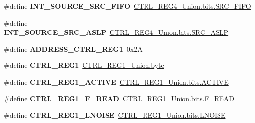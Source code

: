 \begin{DoxyCompactItemize}
\item 
\hypertarget{group__accel__module_ga41ab092f64a12bbfe3919936e495589d}{}\#define {\bfseries I\+N\+T\+\_\+\+S\+O\+U\+R\+C\+E\+\_\+\+S\+R\+C\+\_\+\+F\+I\+F\+O}~\hyperlink{accel_8c_ac35eeae0162158b672b9b7475fe5405a}{C\+T\+R\+L\+\_\+\+R\+E\+G4\+\_\+\+Union.\+bits.\+S\+R\+C\+\_\+\+F\+I\+F\+O}\label{group__accel__module_ga41ab092f64a12bbfe3919936e495589d}

\item 
\hypertarget{group__accel__module_ga8351be89a7b633d5307a31a54880b3ef}{}\#define {\bfseries I\+N\+T\+\_\+\+S\+O\+U\+R\+C\+E\+\_\+\+S\+R\+C\+\_\+\+A\+S\+L\+P}~\hyperlink{accel_8c_acfe1ff99f19cd50c2a089e5313e0db18}{C\+T\+R\+L\+\_\+\+R\+E\+G4\+\_\+\+Union.\+bits.\+S\+R\+C\+\_\+\+A\+S\+L\+P}\label{group__accel__module_ga8351be89a7b633d5307a31a54880b3ef}

\item 
\hypertarget{group__accel__module_ga596d558f36a2924d990dcae16117a5cc}{}\#define {\bfseries A\+D\+D\+R\+E\+S\+S\+\_\+\+C\+T\+R\+L\+\_\+\+R\+E\+G1}~0x2\+A\label{group__accel__module_ga596d558f36a2924d990dcae16117a5cc}

\item 
\hypertarget{group__accel__module_gabd83ea49367ca7850ffc9091890aa46b}{}\#define {\bfseries C\+T\+R\+L\+\_\+\+R\+E\+G1}~\hyperlink{accel_8c_a96f44d20f1dbf1c8785a7bc99a46164c}{C\+T\+R\+L\+\_\+\+R\+E\+G1\+\_\+\+Union.\+byte}\label{group__accel__module_gabd83ea49367ca7850ffc9091890aa46b}

\item 
\hypertarget{group__accel__module_ga58a35d4098c40f651108bad4f42606be}{}\#define {\bfseries C\+T\+R\+L\+\_\+\+R\+E\+G1\+\_\+\+A\+C\+T\+I\+V\+E}~\hyperlink{accel_8c_a9c114f16b9edcd397845a7fe847d2043}{C\+T\+R\+L\+\_\+\+R\+E\+G1\+\_\+\+Union.\+bits.\+A\+C\+T\+I\+V\+E}\label{group__accel__module_ga58a35d4098c40f651108bad4f42606be}

\item 
\hypertarget{group__accel__module_ga90b65e7eecb07db7ee83987093c56a7f}{}\#define {\bfseries C\+T\+R\+L\+\_\+\+R\+E\+G1\+\_\+\+F\+\_\+\+R\+E\+A\+D}~\hyperlink{accel_8c_a176e6b897e703d742c47a3fdf1b92eb2}{C\+T\+R\+L\+\_\+\+R\+E\+G1\+\_\+\+Union.\+bits.\+F\+\_\+\+R\+E\+A\+D}\label{group__accel__module_ga90b65e7eecb07db7ee83987093c56a7f}

\item 
\hypertarget{group__accel__module_ga8be6ba1f1fe4311a05d462f730b7dbdd}{}\#define {\bfseries C\+T\+R\+L\+\_\+\+R\+E\+G1\+\_\+\+L\+N\+O\+I\+S\+E}~\hyperlink{accel_8c_a5e85ae95bebf0d48ee679b7b1cf20d5b}{C\+T\+R\+L\+\_\+\+R\+E\+G1\+\_\+\+Union.\+bits.\+L\+N\+O\+I\+S\+E}\label{group__accel__module_ga8be6ba1f1fe4311a05d462f730b7dbdd}


\end{DoxyCompactItemize}
